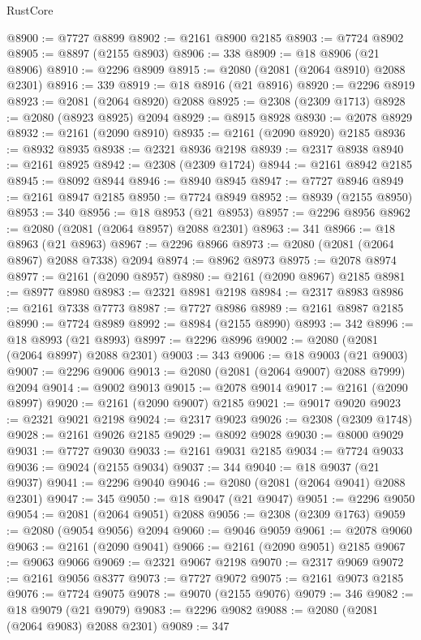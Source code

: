 \begin{lexlean}{RustCore}
\begin{coremodule}
@8900 := @7727 @8899
@8902 := @2161 @8900 @2185
@8903 := @7724 @8902
@8905 := @8897 (@2155 @8903)
@8906 := 338
@8909 := @18 @8906 (@21 @8906)
@8910 := @2296 @8909
@8915 := @2080 (@2081 (@2064 @8910) @2088 @2301)
@8916 := 339
@8919 := @18 @8916 (@21 @8916)
@8920 := @2296 @8919
@8923 := @2081 (@2064 @8920) @2088
@8925 := @2308 (@2309 @1713)
@8928 := @2080 (@8923 @8925) @2094
@8929 := @8915 @8928
@8930 := @2078 @8929
@8932 := @2161 (@2090 @8910)
@8935 := @2161 (@2090 @8920) @2185
@8936 := @8932 @8935
@8938 := @2321 @8936 @2198
@8939 := @2317 @8938
@8940 := @2161 @8925
@8942 := @2308 (@2309 @1724)
@8944 := @2161 @8942 @2185
@8945 := @8092 @8944
@8946 := @8940 @8945
@8947 := @7727 @8946
@8949 := @2161 @8947 @2185
@8950 := @7724 @8949
@8952 := @8939 (@2155 @8950)
@8953 := 340
@8956 := @18 @8953 (@21 @8953)
@8957 := @2296 @8956
@8962 := @2080 (@2081 (@2064 @8957) @2088 @2301)
@8963 := 341
@8966 := @18 @8963 (@21 @8963)
@8967 := @2296 @8966
@8973 := @2080 (@2081 (@2064 @8967) @2088 @7338) @2094
@8974 := @8962 @8973
@8975 := @2078 @8974
@8977 := @2161 (@2090 @8957)
@8980 := @2161 (@2090 @8967) @2185
@8981 := @8977 @8980
@8983 := @2321 @8981 @2198
@8984 := @2317 @8983
@8986 := @2161 @7338 @7773
@8987 := @7727 @8986
@8989 := @2161 @8987 @2185
@8990 := @7724 @8989
@8992 := @8984 (@2155 @8990)
@8993 := 342
@8996 := @18 @8993 (@21 @8993)
@8997 := @2296 @8996
@9002 := @2080 (@2081 (@2064 @8997) @2088 @2301)
@9003 := 343
@9006 := @18 @9003 (@21 @9003)
@9007 := @2296 @9006
@9013 := @2080 (@2081 (@2064 @9007) @2088 @7999) @2094
@9014 := @9002 @9013
@9015 := @2078 @9014
@9017 := @2161 (@2090 @8997)
@9020 := @2161 (@2090 @9007) @2185
@9021 := @9017 @9020
@9023 := @2321 @9021 @2198
@9024 := @2317 @9023
@9026 := @2308 (@2309 @1748)
@9028 := @2161 @9026 @2185
@9029 := @8092 @9028
@9030 := @8000 @9029
@9031 := @7727 @9030
@9033 := @2161 @9031 @2185
@9034 := @7724 @9033
@9036 := @9024 (@2155 @9034)
@9037 := 344
@9040 := @18 @9037 (@21 @9037)
@9041 := @2296 @9040
@9046 := @2080 (@2081 (@2064 @9041) @2088 @2301)
@9047 := 345
@9050 := @18 @9047 (@21 @9047)
@9051 := @2296 @9050
@9054 := @2081 (@2064 @9051) @2088
@9056 := @2308 (@2309 @1763)
@9059 := @2080 (@9054 @9056) @2094
@9060 := @9046 @9059
@9061 := @2078 @9060
@9063 := @2161 (@2090 @9041)
@9066 := @2161 (@2090 @9051) @2185
@9067 := @9063 @9066
@9069 := @2321 @9067 @2198
@9070 := @2317 @9069
@9072 := @2161 @9056 @8377
@9073 := @7727 @9072
@9075 := @2161 @9073 @2185
@9076 := @7724 @9075
@9078 := @9070 (@2155 @9076)
@9079 := 346
@9082 := @18 @9079 (@21 @9079)
@9083 := @2296 @9082
@9088 := @2080 (@2081 (@2064 @9083) @2088 @2301)
@9089 := 347

\end{coremodule}
\end{lexlean}
